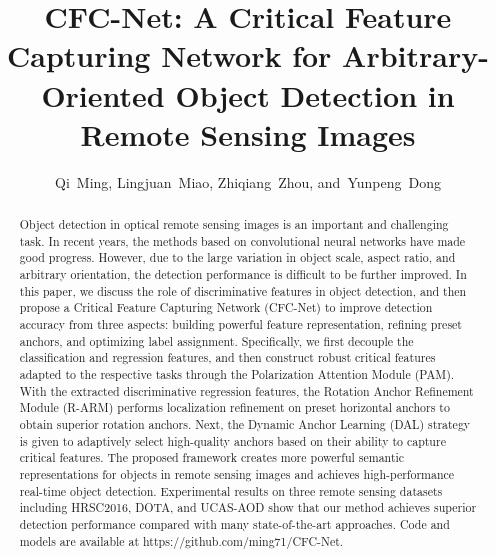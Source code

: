 \documentclass[journal]{IEEEtran}
\begin{document}
\title{CFC-Net: A Critical Feature Capturing Network for Arbitrary-Oriented Object Detection in Remote Sensing Images}


\author{Qi~Ming,
        Lingjuan~Miao,
        Zhiqiang~Zhou,
        and~Yunpeng~Dong

}


















\maketitle

\begin{abstract}
Object detection in optical remote sensing images is an important and challenging task.  In recent years, the methods based on convolutional neural networks have made good progress. However, due to the large variation in object scale, aspect ratio, and arbitrary orientation, the detection performance is difficult to be further improved. In this paper, we discuss the role of discriminative features in object detection, and then propose a Critical Feature Capturing Network (CFC-Net) to improve detection accuracy from three aspects: building powerful feature representation, refining preset anchors, and optimizing label assignment. Specifically, we first decouple the classification and regression features, and then construct robust critical features adapted to the respective tasks through the Polarization Attention Module (PAM). With the extracted discriminative regression features, the Rotation Anchor Refinement Module (R-ARM) performs localization refinement on preset horizontal anchors to obtain superior rotation anchors. Next, the Dynamic Anchor Learning (DAL) strategy is given to adaptively select high-quality anchors based on their ability to capture critical features. The proposed framework creates more powerful semantic representations for objects in  remote sensing images and achieves high-performance real-time object detection. Experimental results on three remote sensing datasets including HRSC2016, DOTA, and UCAS-AOD show that our method achieves superior detection performance compared with many state-of-the-art approaches. Code and models are available at https://github.com/ming71/CFC-Net.
\end{abstract}
\end{document}
